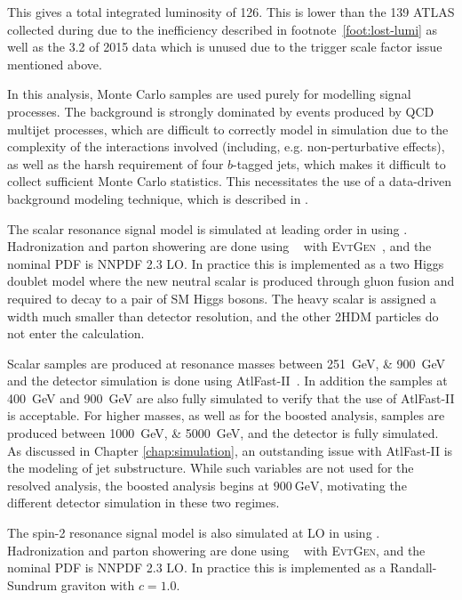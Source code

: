 This gives a total integrated luminosity of \SI{126}{\ifb}.
This is lower than the \SI{139}{\ifb} ATLAS collected during \RunTwo
\cite{ATLAS-CONF-2019-021} due to the inefficiency described in
footnote~\ref{foot:lost-lumi} as well as the \SI{3.2}{\ifb} 
of 2015 data which is unused due to the trigger scale factor 
issue mentioned above.

In this analysis, Monte Carlo samples are used purely for modelling signal
processes. The background is strongly dominated by events produced by QCD
multijet processes, which are difficult to correctly model in simulation due to 
the complexity of the interactions involved (including, e.g. non-perturbative effects), as well as the harsh requirement 
of four $b$-tagged jets, which makes it difficult to collect sufficient Monte Carlo statistics. This
necessitates the use of a data-driven background modeling technique, which is
described in \Sect{\ref{sec:bkgdestimation}}.

The scalar resonance signal model is simulated at leading order in \alphas using
\MADGRAPH\cite{MG5}. Hadronization and parton showering are done using
\HERWIG[7]~\cite{Herwig7}\cite{HerwigPP} with \textsc{EvtGen}~\cite{EvtGen},
and the nominal PDF is NNPDF 2.3 LO. In practice this is implemented as a two
Higgs doublet model where the new neutral scalar is produced through gluon
fusion and required to decay to a pair of SM Higgs bosons. The heavy scalar is
assigned a width much smaller than detector resolution, and the other 2HDM
particles do not enter the calculation.

Scalar samples are produced at resonance masses between \SIlist{251;900}{\GeV} and the detector
simulation is done using AtlFast-II~\cite{SOFT-2010-01}. In addition the samples at \SI{400}{\GeV}
and \SI{900}{\GeV} are also fully simulated to verify that the use of AtlFast-II
is acceptable. For higher masses, as well as for the boosted analysis, 
samples are produced between \SIlist{1000;5000}{\GeV}, and the detector is fully simulated.
As discussed in Chapter \ref{chap:simulation}, an outstanding issue with AtlFast-II is the 
modeling of jet substructure. While such variables are not used for the resolved analysis,
the boosted analysis begins at $\SI{900}{\GeV}$, motivating the different detector 
simulation in these two regimes.

The spin-2 resonance signal model is also simulated at LO in \alphas using
\MADGRAPH. Hadronization and parton showering are done using
\PYTHIA[8]~\cite{Pythia} with \textsc{EvtGen}, and the nominal PDF is NNPDF 2.3
LO. In practice this is implemented as a Randall-Sundrum graviton with $c=1.0$.


